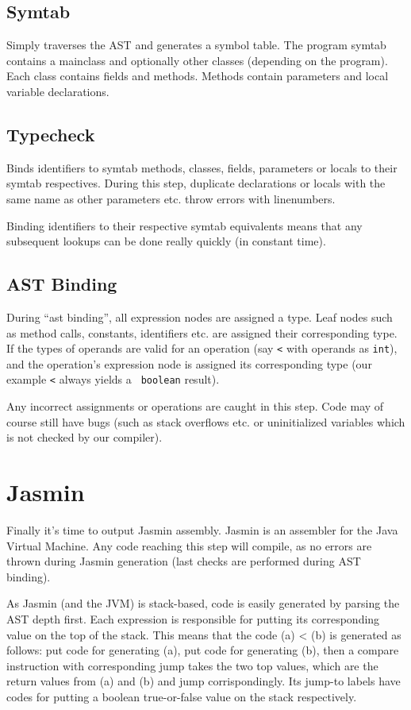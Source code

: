 \documentclass[a4paper,11pt]{article}
\begin{document}
\subsection*{Symtab}

Simply traverses the AST and generates a symbol table. The program symtab
contains a mainclass and optionally other classes (depending on the program).
Each class contains fields and methods. Methods contain parameters and local
variable declarations.

\subsection*{Typecheck}

Binds identifiers to symtab methods, classes, fields, parameters or locals to
their symtab respectives. During this step, duplicate declarations or locals
with the same name as other parameters etc. throw errors with linenumbers.

Binding identifiers to their respective symtab equivalents means that any
subsequent lookups can be done really quickly (in constant time).

\subsection*{AST Binding}

During ``ast binding'', all expression nodes are assigned a type. Leaf nodes
such as method calls, constants, identifiers etc. are assigned their
corresponding type. If the types of operands are valid for an operation (say
{\tt <} with operands as {\tt int}), and the operation's expression node is
assigned its corresponding type (our example {\tt <} always yields a {\tt
boolean} result).

Any incorrect assignments or operations are caught in this step. Code may of
course still have bugs (such as stack overflows etc. or uninitialized variables
which is not checked by our compiler).

\section*{Jasmin}

Finally it's time to output Jasmin assembly. Jasmin is an assembler for the
Java Virtual Machine. Any code reaching this step will compile, as no errors
are thrown during Jasmin generation (last checks are performed during AST
binding).

As Jasmin (and the JVM) is stack-based, code is easily generated by parsing the
AST depth first. Each expression is responsible for putting its corresponding
value on the top of the stack. This means that the code (a) < (b) is generated
as follows: put code for generating (a), put code for generating (b), then
a compare instruction with corresponding jump takes the two top values, which
are the return values from (a) and (b) and jump corrispondingly. Its jump-to
labels have codes for putting a boolean true-or-false value on the stack
respectively.
\end{document}
